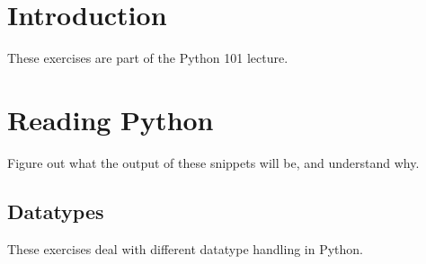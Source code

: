 \documentclass[draft=false]{article}
\begin{document}
\thispagestyle{empty}


\section*{Introduction}

These exercises are part of the Python 101 lecture.

\section{Reading Python}

Figure out what the output of these snippets will be, and understand why.

\setlength{\columnsep}{3em}

\subsection{Datatypes}

These exercises deal with different datatype handling in Python.
\end{document}
